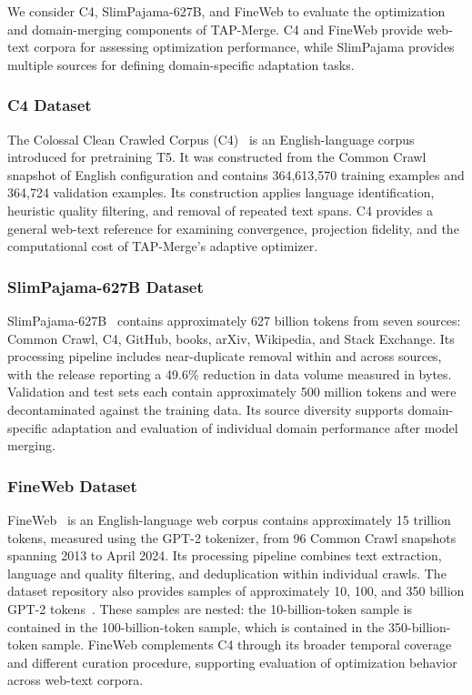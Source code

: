 \documentclass[fleqn,10pt]{wlscirep}
\begin{document}
We consider C4, SlimPajama-627B, and FineWeb to evaluate the optimization
and domain-merging components of TAP-Merge. C4 and FineWeb provide
web-text corpora for assessing optimization performance, while
SlimPajama provides multiple sources for defining domain-specific
adaptation tasks.

\subsubsection{C4 Dataset}
The Colossal Clean Crawled Corpus (C4)~\cite{raffel2020exploring}
is an English-language corpus introduced for pretraining T5.
It was constructed from the Common Crawl snapshot of English configuration
and contains 364,613,570 training examples
and 364,724 validation examples.
Its construction applies language identification, heuristic quality
filtering, and removal of repeated text spans. C4 provides a
general web-text reference for examining convergence, projection
fidelity, and the computational cost of TAP-Merge's adaptive optimizer.

\subsubsection{SlimPajama-627B Dataset}
SlimPajama-627B~\cite{soboleva2023slimpajama} contains approximately
627 billion tokens from seven sources: Common Crawl, C4, GitHub,
books, arXiv, Wikipedia, and Stack Exchange. Its processing
pipeline includes near-duplicate removal within and across
sources, with the release reporting a 49.6\% reduction in data
volume measured in bytes. Validation and test sets each contain approximately 500 million
tokens and were decontaminated against the training data.
Its source diversity supports domain-specific adaptation and
evaluation of individual domain performance after model merging.

\subsubsection{FineWeb Dataset}
FineWeb~\cite{penedo2024fineweb} is an English-language web corpus contains approximately 15 trillion
tokens, measured using the GPT-2 tokenizer, from 96 Common Crawl
snapshots spanning 2013 to April 2024. Its processing pipeline
combines text extraction, language and quality filtering, and
deduplication within individual crawls. The dataset repository
also provides samples of approximately 10, 100, and 350 billion
GPT-2 tokens~\cite{finewebdataset}. These samples are nested:
the 10-billion-token sample is contained in the 100-billion-token
sample, which is contained in the 350-billion-token sample.
FineWeb complements C4 through its broader temporal coverage
and different curation procedure, supporting evaluation of
optimization behavior across web-text corpora.
\end{document}
